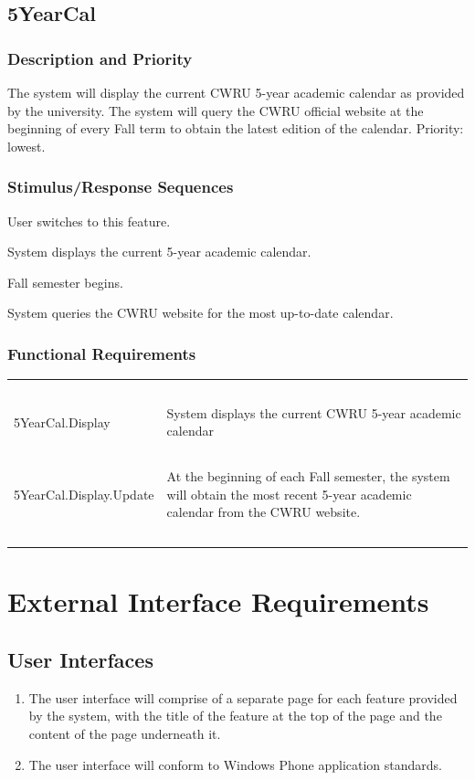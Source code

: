 \documentclass[pdftex,12pt,letter]{article}
\begin{document}
\subsection{5YearCal}
\subsubsection{Description and Priority}
The system will display the current CWRU 5-year academic calendar as provided by the university. The system will query the CWRU official website at the beginning of every Fall term to obtain the latest edition of the calendar. Priority: lowest.
\subsubsection{Stimulus/Response Sequences}
\begin{description}\itemsep1pt
\item[Stimulus:] User switches to this feature.
\item[Response:] System displays the current 5-year academic calendar.
\item[Stimulus:] Fall semester begins.
\item[Response:] System queries the CWRU website for the most up-to-date calendar.
\end{description}
\subsubsection{Functional Requirements}
\begin{table}[!h]
\begin{tabularx}{\textwidth}[t]{|l Y|}
\hline
~&~\\
5YearCal.Display & System displays the current CWRU 5-year academic calendar\\ 
~&~\\
5YearCal.Display.Update & At the beginning of each Fall semester, the system will obtain the most recent 5-year academic calendar from the CWRU website.\\
~&~\\
\hline
\end{tabularx}
\end{table}
\FloatBarrier
\section{External Interface Requirements}
\subsection{User Interfaces}
\begin{enumerate}[UI-1:]
\item The user interface will comprise of a separate page for each feature provided by the system, with the title of the feature at the top of the page and the content of the page underneath it.
\item The user interface will conform to Windows Phone application standards.
\end{enumerate}
\end{document}
